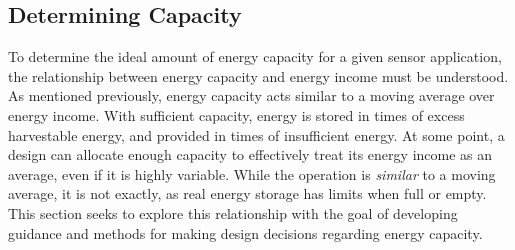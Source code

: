 \subsection{Determining Capacity}
\label{sec:capacity:determining_cap}
To determine the ideal amount of energy capacity for a given sensor application, the relationship between energy capacity and energy income must be understood.
As mentioned previously, energy capacity acts similar to a moving average over energy income. With sufficient capacity, energy is stored in times of excess harvestable energy, and provided in times of insufficient energy.
At some point, a design can allocate enough capacity to effectively treat its energy income as an average, even if it is highly variable.
While the operation is \textit{similar} to a moving average, it is not exactly, as real energy storage has limits when full or empty.
This section seeks to explore this relationship with the goal of developing guidance and methods for making design decisions regarding energy capacity.

